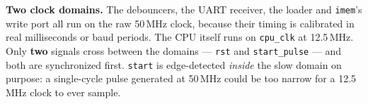 \documentclass[
  25pt,
  margin=0.8in,
  innermargin=0.6in,
  colspace=0.8in,
  blockverticalspace=0.32in
]{tikzposter}
\begin{document}
\begin{columns}
{  \textbf{Two clock domains.} The debouncers, the UART receiver, the
  loader and \texttt{imem}'s write port all run on the raw 50\,MHz clock,
  because their timing is calibrated in real milliseconds or baud
  periods. The CPU itself runs on \texttt{cpu\_clk} at 12.5\,MHz. Only
  \textbf{two} signals cross between the domains --- \texttt{rst} and
  \texttt{start\_pulse} --- and both are synchronized first. \texttt{start}
  is edge-detected \emph{inside} the slow domain on purpose: a
  single-cycle pulse generated at 50\,MHz could be too narrow for a
  12.5\,MHz clock to ever sample.
}
\end{columns}

\end{document}
